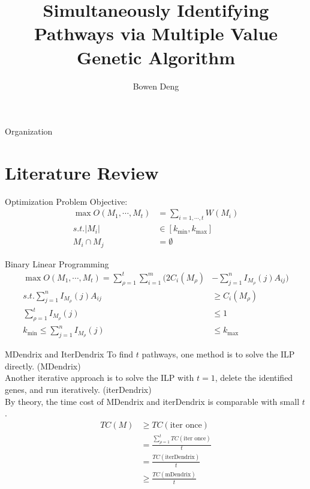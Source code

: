 \documentclass[xcolor=dvipsnames]{beamer}
\begin{document}
\title{Simultaneously Identifying Pathways via Multiple Value Genetic Algorithm}
\author{Bowen Deng}
\date{}
\begin{frame}
\maketitle
\end{frame}
\begin{frame}{Organization}
\tableofcontents
\end{frame}
\section{Literature Review}
\begin{frame}{Optimization Problem}
Objective:
\begin{displaymath}
\begin{split}
\max O(M_1,\cdots,M_t)&=\sum_{i=1,\cdots,t} W(M_i)\\
s.t. |M_i|&\in[k_{\min},k_{\max}]\\
M_i\cap M_j&=\emptyset
\end{split}
\end{displaymath}
\end{frame}
\begin{frame}{Binary Linear Programming}
\begin{displaymath}
\begin{split}
\max O(M_1,\cdots,M_t)=\sum_{\rho=1}^t\sum_{i=1}^m(2C_i(M_{\rho})&-\sum_{j=1}^nI_{M_{\rho}}(j)A_{ij})\\
s.t. \sum_{j=1}^nI_{M_{\rho}}(j)A_{ij}&\geqslant C_i(M_{\rho})\\
\sum_{\rho=1}^tI_{M_{\rho}}(j)&\leqslant 1\\
k_{\min}\leqslant \sum_{j=1}^nI_{M_{\rho}}(j)&\leqslant k_{\max}
\end{split}
\end{displaymath}
\end{frame}
\begin{frame}{MDendrix and IterDendrix}
To find $t$ pathways, one method is to solve the ILP directly. (MDendrix)\\
Another iterative approach is to solve the ILP with $t=1$, delete the identified genes, and run iteratively. (iterDendrix)\\
By theory, the time cost of MDendrix and iterDendrix is comparable with small $t$.\\
\begin{displaymath}
\begin{split}
TC(M)&\geqslant TC(\text{iter once})\\
&=\frac{\sum_{\rho=1}^tTC(\text{iter once})}{t}\\
&=\frac{TC(\text{iterDendrix})}{t}\\
&\geqslant \frac{TC(\text{mDendrix})}{t}
\end{split}
\end{displaymath}
\end{frame}
\end{document}
